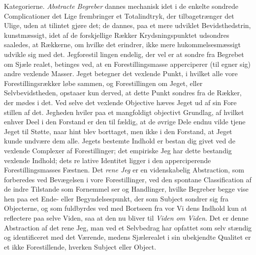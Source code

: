 \documentclass[12pt,a4paper]{book}
\begin{document}
Kategorierne. \emph{Abstracte Begreber} dannes mechanisk idet
i de enkelte sondrede Complicationer det Lige frembringer
et Totalindtryk, der tilbagetrænger det Ulige, uden at tilintet\-%
gjøre det; de dannes, paa et mere udviklet Bevidsthedstrin,
kunstmæssigt, idet af de forskjellige Rækker Krydsningspunktet
udsondres saaledes, at Rækkerne, om hvilke det erindrer, ikke
mere hukommelsesmæssigt udvikle sig med det. Jegforestil\-%
lingen endelig, der vel er at sondre fra Begrebet om Sjæle\-%
realet, betinges ved, at en Forestillingsmasse apperciperer (til\-%
egner sig) andre vexlende Masser. Jeget betegner det vexlende
Punkt, i hvilket alle vore Forestillingsrækker løbe sammen, og
Forestillingen om Jeget, eller Selvbevidstheden, opstaaer kun
derved, at dette Punkt sondres fra de Rækker, der mødes i det.
Ved selve det vexlende Objective hæves Jeget ud af sin Fore\-%
stillen af det. Jegheden hviler paa et mangfoldigt objectivt
Grundlag, af hvilket enhver Deel i den Forstand er den til\-%
fældig, at de øvrige Dele endnu vilde tjene Jeget til Støtte,
naar hint blev borttaget, men ikke i den Forstand, at Jeget
kunde undvære dem alle. Jegets bestemte Indhold er bestan\-%
dig givet ved de vexlende Complexer af Forestillinger; det
empiriske Jeg har dette bestandig vexlende Indhold; dets re\-%
lative Identitet ligger i den apperciperende Forestillingsmasses
Fæstnen. Det \emph{rene Jeg} er en videnskabelig Abstraction,
som forberedes ved Bevægelsen i vore Forestillinger, ved den
spontane Classification af de indre Tilstande som Fornemmel\-%
ser og Handlinger, hvilke Begreber begge vise hen paa eet
Ende- eller Begyndelsespunkt, der som Subject sondrer sig
fra Objecterne, og som fuldbyrdes ved med Bortseen fra vor Vi\-%
dens Indhold kun at reflectere paa selve Viden, saa at den
nu bliver til \emph{Viden om Viden}. Det er denne Abstraction
af det rene Jeg, man ved et Selvbedrag har opfattet som selv\-%
stændig og identificeret med det Værende, medens Sjælerealet
i sin ubekjendte Qualitet er et ikke Forestillende, hverken
Subject eller Object.
\end{document}
